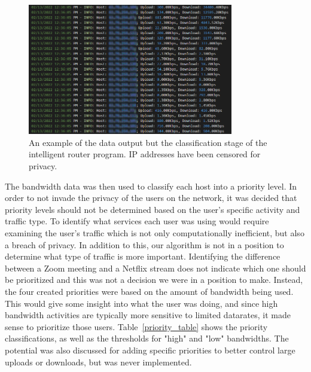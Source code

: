 \begin{figure}[!ht]
    \centering
    \includegraphics[width=0.8\textwidth,keepaspectratio]{Images/Chpt4/LogFile.png}
    \caption{An example of the data output but the classification stage of the intelligent router program. IP addresses have been censored for privacy.}
    \label{log_file}
\end{figure}
The bandwidth data was then used to classify each host into a priority level.
In order to not invade the privacy of the users on the network, it was decided that priority levels should not be determined based on the user's specific activity and traffic type.
To identify what services each user was using would require examining the user's traffic which is not only computationally inefficient, but also a breach of privacy.
In addition to this, our algorithm is not in a position to determine what type of traffic is more important.
Identifying the difference between a Zoom meeting and a Netflix stream does not indicate which one should be prioritized and this was not a decision we were in a position to make.
Instead, the four created priorities were based on the amount of bandwidth being used.
This would give some insight into what the user was doing, and since high bandwidth activities are typically more sensitive to limited datarates, it made sense to prioritize those users.
Table~\ref{priority_table} shows the priority classifications, as well as the thresholds for "high" and "low" bandwidths.
The potential was also discussed for adding specific priorities to better control large uploads or downloads, but was never implemented.\par
